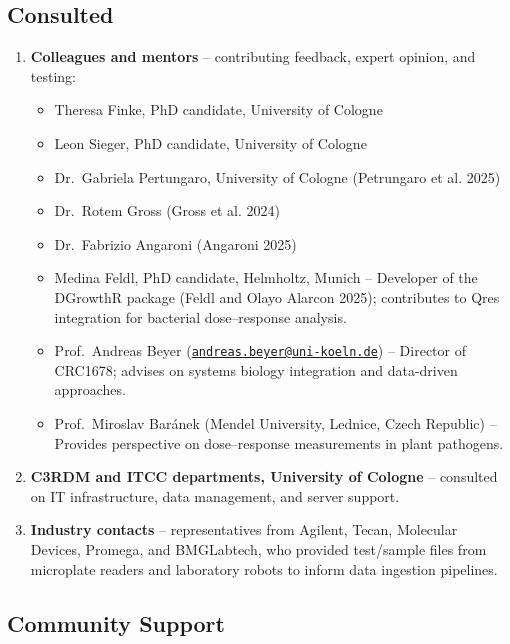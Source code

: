 \documentclass[
  letterpaper,
  DIV=11,
  numbers=noendperiod]{scrartcl}
\providecommand{\tightlist}{%
  \setlength{\itemsep}{0pt}\setlength{\parskip}{0pt}}
\begin{document}
\subsection{Consulted}\label{consulted}

\begin{enumerate}
\def\labelenumi{\arabic{enumi}.}
\item
  \textbf{Colleagues and mentors} -- contributing feedback, expert
  opinion, and testing:

  \begin{itemize}
  \tightlist
  \item
    Theresa Finke, PhD candidate, University of Cologne
  \item
    Leon Sieger, PhD candidate, University of Cologne
  \item
    Dr.~Gabriela Pertungaro, University of Cologne (Petrungaro et al.
    2025)
  \item
    Dr.~Rotem Gross (Gross et al. 2024)
  \item
    Dr.~Fabrizio Angaroni (Angaroni 2025)
  \item
    Medina Feldl, PhD candidate, Helmholtz, Munich -- Developer of the
    DGrowthR package (Feldl and Olayo Alarcon 2025); contributes to Qres
    integration for bacterial dose--response analysis.
  \item
    Prof.~Andreas Beyer
    (\href{mailto:andreas.beyer@uni-koeln.de}{\nolinkurl{andreas.beyer@uni-koeln.de}})
    -- Director of CRC1678; advises on systems biology integration and
    data-driven approaches.
  \item
    Prof.~Miroslav Baránek (Mendel University, Lednice, Czech Republic)
    -- Provides perspective on dose--response measurements in plant
    pathogens.
  \end{itemize}
\item
  \textbf{C3RDM and ITCC departments, University of Cologne} --
  consulted on IT infrastructure, data management, and server support.
\item
  \textbf{Industry contacts} -- representatives from Agilent, Tecan,
  Molecular Devices, Promega, and BMGLabtech, who provided test/sample
  files from microplate readers and laboratory robots to inform data
  ingestion pipelines.
\end{enumerate}

\subsection{Community Support}\label{community-support}
\end{document}
